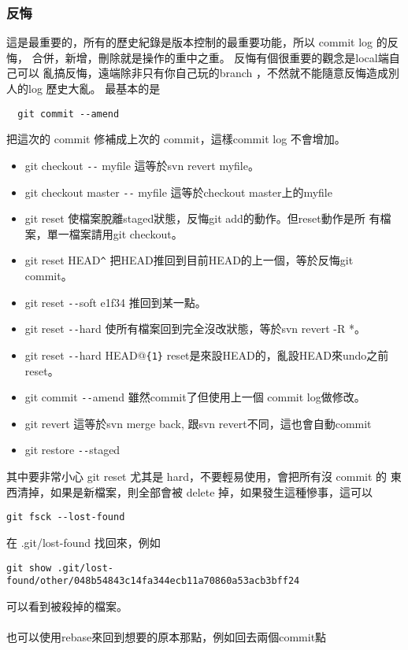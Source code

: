   \subsubsection{反悔}
  這是最重要的，所有的歷史紀錄是版本控制的最重要功能，所以 commit log 的反悔，
  合併，新增，刪除就是操作的重中之重。 反悔有個很重要的觀念是local端自己可以
  亂搞反悔，遠端除非只有你自己玩的branch ，不然就不能隨意反悔造成別人的log
  歷史大亂。 最基本的是
  \begin{verbatim}
  git commit --amend
  \end{verbatim}
  把這次的 commit 修補成上次的 commit，這樣commit log 不會增加。
  \begin{itemize}
    \item git checkout \verb=--= myfile 這等於svn revert myfile。
    \item git checkout master \verb=--= myfile 這等於checkout master上的myfile
    \item git reset 使檔案脫離staged狀態，反悔git add的動作。但reset動作是所
      有檔案，單一檔案請用git checkout。
    \item git reset HEAD\verb=^= 把HEAD推回到目前HEAD的上一個，等於反悔git commit。
    \item git reset \verb=--=soft e1f34 推回到某一點。
    \item git reset \verb=--=hard 使所有檔案回到完全沒改狀態，等於svn revert -R *。
    \item git reset \verb=--=hard HEAD@\verb={1}= reset是來設HEAD的，亂設HEAD來undo之前reset。
    \item git commit \verb=--=amend 雖然commit了但使用上一個 commit log做修改。
    \item git revert 這等於svn merge back, 跟svn revert不同，這也會自動commit
    \item git restore \verb=--=staged
  \end{itemize}
  其中要非常小心 git reset 尤其是 hard，不要輕易使用，會把所有沒 commit 的
  東西清掉，如果是新檔案，則全部會被 delete 掉，如果發生這種慘事，這可以
  \begin{verbatim}
git fsck --lost-found
  \end{verbatim}
  在 .git/lost-found 找回來，例如
  \begin{verbatim}
git show .git/lost-found/other/048b54843c14fa344ecb11a70860a53acb3bff24
  \end{verbatim}
  可以看到被殺掉的檔案。
  \\\\
  也可以使用rebase來回到想要的原本那點，例如回去兩個commit點
